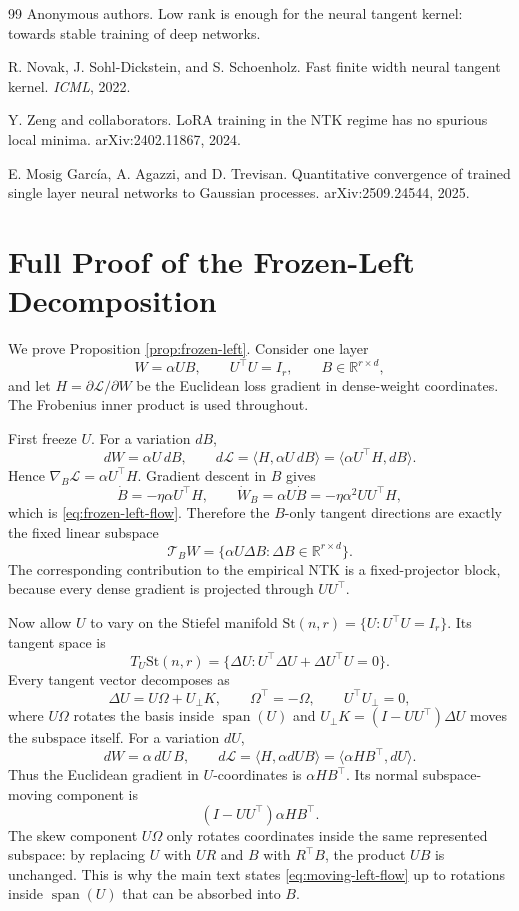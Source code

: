 \documentclass{article}
\newcommand{\R}{\mathbb R}
\begin{document}
\begin{thebibliography}{99}
Anonymous authors.
\newblock Low rank is enough for the neural tangent kernel: towards stable training of deep networks.

R. Novak, J. Sohl-Dickstein, and S. Schoenholz.
\newblock Fast finite width neural tangent kernel.
\newblock \emph{ICML}, 2022.

Y. Zeng and collaborators.
\newblock LoRA training in the NTK regime has no spurious local minima.
\newblock arXiv:2402.11867, 2024.

E. Mosig García, A. Agazzi, and D. Trevisan.
\newblock Quantitative convergence of trained single layer neural networks to Gaussian processes.
\newblock arXiv:2509.24544, 2025.
\end{thebibliography}

\appendix

\section{Full Proof of the Frozen-Left Decomposition}
\label{app:frozen-left-full-proof}
We prove Proposition \ref{prop:frozen-left}. Consider one layer
\[
W=\alpha UB,\qquad U^\top U=I_r,\qquad B\in\R^{r\times d},
\]
and let \(H=\partial \mathcal L/\partial W\) be the Euclidean loss gradient in dense-weight coordinates. The Frobenius inner product is used throughout.

First freeze \(U\). For a variation \(dB\),
\[
dW=\alpha U\,dB,
\qquad
d\mathcal L
=\langle H,\alpha U\,dB\rangle
=\langle \alpha U^\top H,dB\rangle.
\]
Hence \(\nabla_B\mathcal L=\alpha U^\top H\). Gradient descent in \(B\) gives
\[
\dot B=-\eta\alpha U^\top H,
\qquad
\dot W_B=\alpha U\dot B
=-\eta\alpha^2UU^\top H,
\]
which is \eqref{eq:frozen-left-flow}. Therefore the \(B\)-only tangent directions are exactly the fixed linear subspace
\[
\mathcal T_B W=\{\alpha U\Delta B:\Delta B\in\R^{r\times d}\}.
\]
The corresponding contribution to the empirical NTK is a fixed-projector block, because every dense gradient is projected through \(UU^\top\).

Now allow \(U\) to vary on the Stiefel manifold \(\mathrm{St}(n,r)=\{U:U^\top U=I_r\}\). Its tangent space is
\[
T_U\mathrm{St}(n,r)
=\{\Delta U:U^\top\Delta U+\Delta U^\top U=0\}.
\]
Every tangent vector decomposes as
\[
\Delta U=U\Omega+U_\perp K,
\qquad
\Omega^\top=-\Omega,
\qquad
U^\top U_\perp=0,
\]
where \(U\Omega\) rotates the basis inside \(\operatorname{span}(U)\) and \(U_\perp K=(I-UU^\top)\Delta U\) moves the subspace itself. For a variation \(dU\),
\[
dW=\alpha\,dU\,B,
\qquad
d\mathcal L
=\langle H,\alpha dU B\rangle
=\langle \alpha H B^\top,dU\rangle.
\]
Thus the Euclidean gradient in \(U\)-coordinates is \(\alpha HB^\top\). Its normal subspace-moving component is
\[
(I-UU^\top)\alpha HB^\top.
\]
The skew component \(U\Omega\) only rotates coordinates inside the same represented subspace: by replacing \(U\) with \(UR\) and \(B\) with \(R^\top B\), the product \(UB\) is unchanged. This is why the main text states \eqref{eq:moving-left-flow} up to rotations inside \(\operatorname{span}(U)\) that can be absorbed into \(B\).
\end{document}
